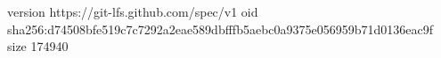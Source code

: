 version https://git-lfs.github.com/spec/v1
oid sha256:d74508bfe519c7c7292a2eae589dbfffb5aebc0a9375e056959b71d0136eac9f
size 174940
